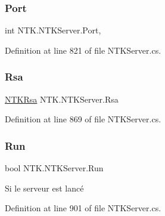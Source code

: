 \mbox{\label{class_n_t_k_1_1_n_t_k_server_a0c98a3dd7c9f238f5ebbb8300a97791a}} 
\subsubsection{\texorpdfstring{Port}{Port}}
{\footnotesize\ttfamily int N\+T\+K.\+N\+T\+K\+Server.\+Port\hspace{0.3cm}{\ttfamily [get]}, {\ttfamily [set]}}







Definition at line 821 of file N\+T\+K\+Server.\+cs.

\mbox{\label{class_n_t_k_1_1_n_t_k_server_a8980901f62a2080be6b10fe0e065b9cb}} 
\subsubsection{\texorpdfstring{Rsa}{Rsa}}
{\footnotesize\ttfamily \mbox{\hyperlink{class_n_t_k_1_1_security_1_1_n_t_k_rsa}{N\+T\+K\+Rsa}} N\+T\+K.\+N\+T\+K\+Server.\+Rsa\hspace{0.3cm}{\ttfamily [get]}}







Definition at line 869 of file N\+T\+K\+Server.\+cs.

\mbox{\label{class_n_t_k_1_1_n_t_k_server_aa2366e0763f42b453394c5f082f79a02}} 
\subsubsection{\texorpdfstring{Run}{Run}}
{\footnotesize\ttfamily bool N\+T\+K.\+N\+T\+K\+Server.\+Run\hspace{0.3cm}{\ttfamily [get]}}



Si le serveur est lancé 



Definition at line 901 of file N\+T\+K\+Server.\+cs.

